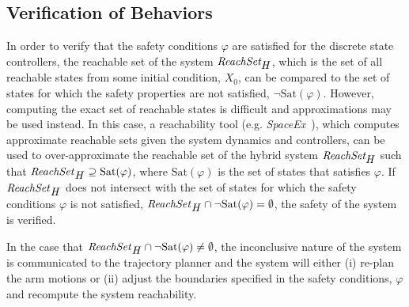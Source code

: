 \subsection{Verification of Behaviors}
In order to verify that the safety conditions $\varphi$ are satisfied for the discrete state controllers, the reachable set of the system $\textit{ReachSet}_{\mbox{\textit{H}}}$, which is the set of all reachable states from some initial condition, $X_0$, can be compared to the set of states for which the safety properties are not satisfied, $\neg \mbox{Sat}(\varphi)$.
However, computing the exact set of reachable states is difficult \cite{Henzinger:1995:WDH:225058.225162} and approximations may be used instead.
In this case, a reachability tool (e.g. \textit{SpaceEx}~\cite{rehseGDCRLRGDM11}), which computes approximate reachable sets given the system dynamics and controllers, can be used to over-approximate the reachable set of the hybrid system $\textit{ReachSet}_{\mbox{\textit{H}}}$ such that $\mbox{\textit{ReachSet}}_{\mbox{\textit{H}}} \supseteq \mbox{Sat}(\varphi)$, where $\mbox{Sat}(\varphi)$ is the set of states that satisfies $\varphi$.
If $\mbox{\textit{ReachSet}}_{\mbox{\textit{H}}}$ does not intersect with the set of states for which the safety conditions $\varphi$ is not satisfied, $\mbox{\textit{ReachSet}}_{\mbox{\textit{H}}} \cap \neg \mbox{Sat}(\varphi) = \emptyset$, the safety of the system is verified.

In the case that $\mbox{\textit{ReachSet}}_{\mbox{\textit{H}}} \cap \neg \mbox{Sat}(\varphi) \neq \emptyset$, the inconclusive nature of the system is communicated to the trajectory planner and the system will either (i) re-plan the arm motions or (ii) adjust the boundaries specified in the safety conditions, $\varphi$ and recompute the system reachability.


